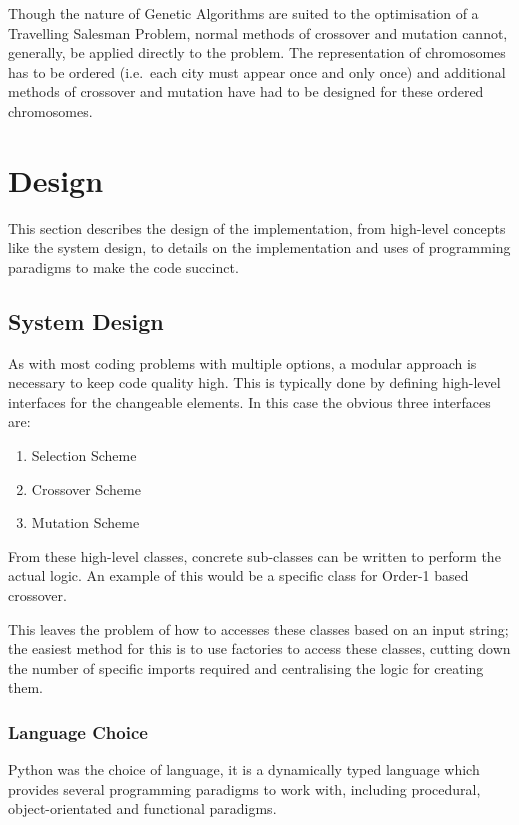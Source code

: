 \documentclass[10pt, a4paper]{article}
\begin{document}
Though the nature of Genetic Algorithms are suited to the optimisation of a
Travelling Salesman Problem, normal methods of crossover and mutation cannot,
generally, be applied directly to the problem. The representation of 
chromosomes has to be ordered (i.e.\ each city must appear once and only once)
and additional methods of crossover and mutation have had to be designed for
these ordered chromosomes.

\newpage
\section{Design}
This section describes the design of the implementation, from high-level
concepts like the system design, to details on the implementation and uses of
programming paradigms to make the code succinct.

\subsection{System Design}
As with most coding problems with multiple options, a modular approach is
necessary to keep code quality high. This is typically done by defining
high-level interfaces for the changeable elements. In this case the obvious
three interfaces are:

\begin{enumerate}
\item Selection Scheme
\item Crossover Scheme
\item Mutation Scheme
\end{enumerate}

From these high-level classes, concrete sub-classes can be written to perform
the actual logic. An example of this would be a specific class for Order-1
based crossover.

This leaves the problem of how to accesses these classes based on an input
string; the easiest method for this is to use factories to access these 
classes, cutting down the number of specific imports required and centralising
the logic for creating them.



\subsubsection{Language Choice}
Python was the choice of language, it is a dynamically typed language which 
provides several programming paradigms to work with, including procedural,
object-orientated and functional paradigms.
\end{document}
